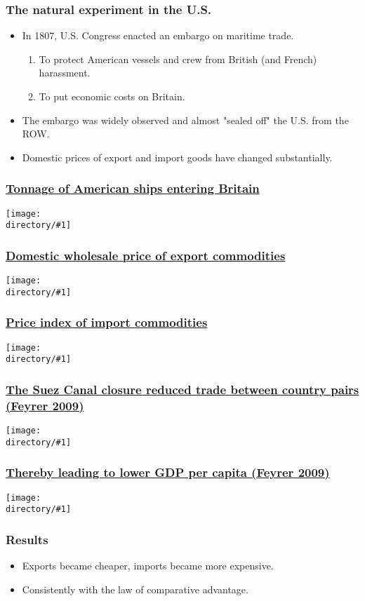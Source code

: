 \documentclass[compress,mathserif,aspectratio=169]{beamer}
\newcommand{\directory}{figures}
\newcommand{\widefigure}[2]{\begin{frame}\frametitle{\hyperlink{#1back}{#2}}\hypertarget{#1}{{\begin{center}\texttt{[image: \\directory/\#1]}\end{center}}}\end{frame}}
\newcommand{\longfigure}[2]{\begin{frame}\frametitle{\hyperlink{#1back}{#2}}\hypertarget{#1}{{\begin{center}\texttt{[image: \\directory/\#1]}\end{center}}}\end{frame}}
\begin{document}
\begin{frame}\frametitle{The natural experiment in the U.S.}\hypertarget{The natural experiment in the U.S.}{}
\begin{itemize}
\item In 1807, U.S. Congress enacted an embargo on maritime trade.
\begin{enumerate}\setcounter{enumi}{0}
\item To protect American vessels and crew from British (and French) harassment.

\item To put economic costs on Britain.
\end{enumerate}

\item The embargo was widely observed and almost "sealed off" the U.S. from the ROW.

\item Domestic prices of export and import goods have changed substantially.


\end{itemize}
\end{frame}




\widefigure{tonnage}{Tonnage of American ships entering Britain}
\widefigure{us-exports}{Domestic wholesale price of export commodities}
\widefigure{us-imports}{Price index of import commodities}


\longfigure{suez-1st-stage}{The Suez Canal closure reduced trade between country pairs (Feyrer 2009)}
\widefigure{suez-2nd-stage}{Thereby leading to lower GDP per capita (Feyrer 2009)}


\begin{frame}\frametitle{Results}\hypertarget{Results}{}
\begin{itemize}
\item Exports became cheaper, imports became more expensive.

\item Consistently with the law of comparative advantage.








\end{itemize}
\end{frame}
\end{document}
